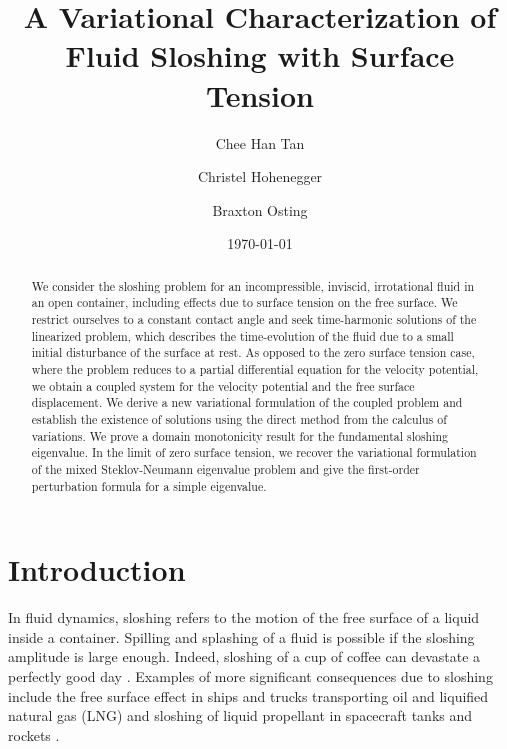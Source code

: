 \documentclass[letterpaper, 12pt]{amsart}
\begin{document}
\title{A Variational Characterization of \\ Fluid Sloshing with Surface Tension}
\author{Chee Han Tan}
\author{Christel Hohenegger}
\author{Braxton Osting}
\address{Department of Mathematics, University of Utah, Salt Lake City, UT 84112}



\date{\today}

\begin{abstract}
We consider the sloshing problem for an incompressible, inviscid, irrotational fluid in an open container, including effects due to surface tension on the free surface. We restrict ourselves to a constant contact angle and seek time-harmonic solutions of the linearized problem, which describes the time-evolution of the fluid due to a small initial disturbance of the surface at rest. As opposed to the zero surface tension case, where the problem reduces to a partial differential equation for the velocity potential, we obtain a coupled system for the velocity potential and the free surface displacement. We derive a new variational formulation of the coupled problem and establish the existence of solutions using the direct method from the calculus of variations. 
We prove a domain monotonicity result for the fundamental sloshing eigenvalue. In the limit of zero surface tension, we recover the variational formulation of the  mixed Steklov-Neumann eigenvalue problem and  give the first-order perturbation formula for a simple eigenvalue. 
\end{abstract}

\maketitle

\section{Introduction}
In fluid dynamics, sloshing refers to the motion of the free surface of a liquid inside a container. 
Spilling and splashing of a fluid is possible if the sloshing amplitude is large enough. 
Indeed, sloshing of a cup of coffee can devastate a perfectly good day \cite{Mayer:2012aa}. Examples of more significant consequences due to sloshing  include the free surface effect in ships and trucks transporting oil and liquified natural gas (LNG) \cite{Abramson:1976aa, Faltinsen:2009aa} and sloshing of liquid propellant in spacecraft tanks and rockets \cite{Abramson:1966aa, Ibrahim:2005aa}.  
\end{document}
